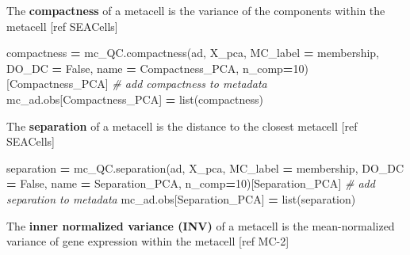 \documentclass[
]{book}
\newenvironment{Shaded}{\begin{snugshade}}{\end{snugshade}}
\newcommand{\BuiltInTok}[1]{#1}
\newcommand{\CommentTok}[1]{\textcolor[rgb]{0.56,0.35,0.01}{\textit{#1}}}
\newcommand{\DecValTok}[1]{\textcolor[rgb]{0.00,0.00,0.81}{#1}}
\newcommand{\NormalTok}[1]{#1}
\newcommand{\OperatorTok}[1]{\textcolor[rgb]{0.81,0.36,0.00}{\textbf{#1}}}
\newcommand{\StringTok}[1]{\textcolor[rgb]{0.31,0.60,0.02}{#1}}
\newcommand{\VariableTok}[1]{\textcolor[rgb]{0.00,0.00,0.00}{#1}}
\begin{document}
The \textbf{compactness} of a metacell is the variance of the components within the metacell {[}ref SEACells{]}

\begin{Shaded}
\begin{Highlighting}[]
\NormalTok{compactness }\OperatorTok{=}\NormalTok{ mc\_QC.compactness(ad, }\StringTok{\textquotesingle{}X\_pca\textquotesingle{}}\NormalTok{, MC\_label }\OperatorTok{=} \StringTok{\textquotesingle{}membership\textquotesingle{}}\NormalTok{, DO\_DC }\OperatorTok{=} \VariableTok{False}\NormalTok{, name }\OperatorTok{=} \StringTok{\textquotesingle{}Compactness\_PCA\textquotesingle{}}\NormalTok{, n\_comp}\OperatorTok{=}\DecValTok{10}\NormalTok{)[}\StringTok{\textquotesingle{}Compactness\_PCA\textquotesingle{}}\NormalTok{]}
\CommentTok{\# add compactness to metadata}
\NormalTok{mc\_ad.obs[}\StringTok{\textquotesingle{}Compactness\_PCA\textquotesingle{}}\NormalTok{] }\OperatorTok{=} \BuiltInTok{list}\NormalTok{(compactness)}
\end{Highlighting}
\end{Shaded}

The \textbf{separation} of a metacell is the distance to the closest metacell {[}ref SEACells{]}

\begin{Shaded}
\begin{Highlighting}[]
\NormalTok{separation }\OperatorTok{=}\NormalTok{ mc\_QC.separation(ad, }\StringTok{\textquotesingle{}X\_pca\textquotesingle{}}\NormalTok{, MC\_label }\OperatorTok{=} \StringTok{\textquotesingle{}membership\textquotesingle{}}\NormalTok{, DO\_DC }\OperatorTok{=} \VariableTok{False}\NormalTok{, name }\OperatorTok{=} \StringTok{\textquotesingle{}Separation\_PCA\textquotesingle{}}\NormalTok{, n\_comp}\OperatorTok{=}\DecValTok{10}\NormalTok{)[}\StringTok{\textquotesingle{}Separation\_PCA\textquotesingle{}}\NormalTok{]}
\CommentTok{\# add separation to metadata}
\NormalTok{mc\_ad.obs[}\StringTok{\textquotesingle{}Separation\_PCA\textquotesingle{}}\NormalTok{] }\OperatorTok{=} \BuiltInTok{list}\NormalTok{(separation)}
\end{Highlighting}
\end{Shaded}

The \textbf{inner normalized variance (INV)} of a metacell is the mean-normalized variance of gene expression within the metacell {[}ref MC-2{]}
\end{document}
